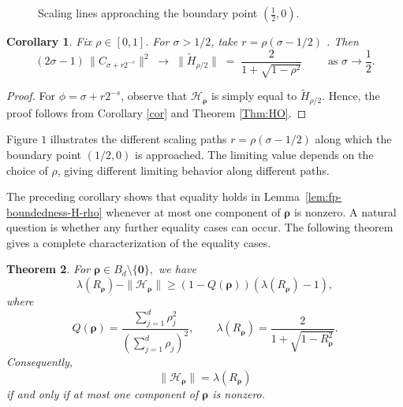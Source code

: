 \documentclass[12pt, reqno]{amsart}
\numberwithin{equation}{section}
\newtheorem{theorem}{Theorem}[section]
\newtheorem{corollary}[theorem]{Corollary}
\begin{document}
\begin{figure}[htbp]
\begin{center}
\end{center}
\caption{Scaling lines approaching the boundary point $(\frac12,0)$.}
\end{figure}


\begin{corollary}\label{cor: affine}
Fix $\rho \in[0,1].$ For $\sigma>1/2$, take $r=\rho(\sigma-1/2)$ . Then
\[
(2\sigma-1)\,\|C_{\sigma + r{2^{-s}}}\|^2 \;\longrightarrow\; \|\widetilde{H}_{\rho/2}\|
\;=\;
\frac{2}{1 + \sqrt{1 - \rho^2}}\qquad \text{ as }\sigma\to \frac{1}{2}.
\]

\end{corollary}
\begin{proof}
For $\phi=\sigma+r2^{-s}$, observe that $\mathcal{H}_{\boldsymbol{\rho}}$ is simply equal to $\widetilde{H}_{{\rho}/2}$. Hence, the proof follows from Corollary \ref{cor} and Theorem \ref{Thm:HO}.
\end{proof}
Figure $1$ illustrates the different scaling paths $r=\rho(\sigma-1/2)$ along which the boundary point $(1/2,0)$ is approached. The limiting value depends on the choice of $\rho$, giving different limiting behavior along different paths.

The preceding corollary shows that equality holds in Lemma~\ref{lem:fp-boundedness-H-rho} whenever at most one component of $\boldsymbol{\rho}$ is nonzero. A natural question is whether any further equality cases can occur. The following theorem gives a complete
characterization of the equality cases.



\begin{theorem}
    For $\boldsymbol{\rho}\in B_d\setminus\{\boldsymbol{0}\},$ we have \[
\lambda(R_{\boldsymbol\rho})
-
\|\mathcal H_{\boldsymbol\rho}\|
\geq
\left(1-Q(\boldsymbol\rho)\right)
\left(\lambda(R_{\boldsymbol\rho})-1\right),
\] where
\[
Q(\boldsymbol\rho)
=
\frac{\sum_{j=1}^d\rho_j^2}
{\left(\sum_{j=1}^d\rho_j\right)^2}, \qquad \lambda(R_{\boldsymbol{\rho}})
=
\frac{2}{1+\sqrt{1-R_{\boldsymbol{\rho}}^2}}.
\]
Consequently, \[
\|\mathcal H_{\boldsymbol\rho}\|
=
\lambda(R_{\boldsymbol\rho})
\]
if and only if at most one component of \(\boldsymbol\rho\) is nonzero.
\end{theorem}
\end{document}
